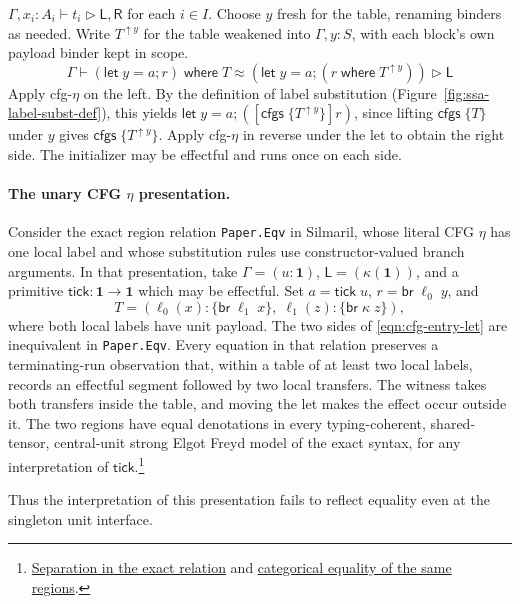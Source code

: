 \documentclass[acmsmall,screen,review]{acmart}
\newcommand{\mb}[1]{\ensuremath{\mathbf{#1}}}
\newcommand{\ms}[1]{\ensuremath{\mathsf{#1}}}
\newcommand{\lto}{:}
\newcommand{\letstmt}[3]{\ensuremath{\ms{let}\;#1 = #2; #3}}
\newcommand{\brb}[2]{\ms{br}\;#1\;#2}
\newcommand{\where}[2]{#1\;\ms{where}\;#2}
\newcommand{\wbranch}[3]{#1(#2) \lto \{#3\}}
\newcommand{\cfgsubst}[1]{\ms{cfgs}\;\{#1\}}
\newcommand{\bhyp}[2]{#1 : #2}
\newcommand{\lhyp}[2]{#1(#2)}
\newcommand{\haslb}[3]{#1 \vdash #2 \rhd #3}
\newcommand{\teqv}{\approx}
\newcommand{\lbeq}[4]{#1 \vdash #2 \teqv #3 \rhd {#4}}
\newcommand{\brle}[1]{{\textsf{#1}}}
\begin{document}
$\haslb{\Gamma,\bhyp{x_i}{A_i}}{t_i}{\ms{L},\ms{R}}$ for each $i\in I$.
Choose $y$ fresh for the table, renaming binders as needed. Write $T^{\uparrow y}$
for the table weakened into $\Gamma,y:S$, with each block's own payload binder kept
in scope.
\begin{equation}
  \lbeq{\Gamma}
    {\where{(\letstmt{y}{a}{r})}{T}}
    {(\letstmt{y}{a}{(\where{r}{T^{\uparrow y}})})}
    {\ms{L}}
  \label{eqn:cfg-entry-let}
\end{equation}
Apply \brle{cfg-$\eta$} on the left. By the definition of label substitution
(Figure~\ref{fig:ssa-label-subst-def}), this yields
$\letstmt{y}{a}{([\cfgsubst{T^{\uparrow y}}]r)}$,
since lifting $\cfgsubst{T}$ under $y$ gives $\cfgsubst{T^{\uparrow y}}$.
Apply \brle{cfg-$\eta$} in reverse under the let to obtain the right side.
The initializer may be effectful and runs once on each side.

\paragraph{The unary CFG $\eta$ presentation.}
Consider the exact region relation \texttt{Paper.Eqv} in Silmaril, whose
literal CFG $\eta$ has one local label and whose substitution rules use
constructor-valued branch arguments. In that presentation, take
$\Gamma=(u:\mb{1})$, $\ms{L}=(\lhyp{\kappa}{\mb{1}})$, and a
primitive $\ms{tick}:\mb{1}\to\mb{1}$ which may be effectful. Set
$a=\ms{tick}\;u$, $r=\brb{\ell_0}{y}$, and
\begin{equation*}
  T=(\wbranch{\ell_0}{x}{\brb{\ell_1}{x}},\;
     \wbranch{\ell_1}{z}{\brb{\kappa}{z}}),
\end{equation*}
where both local labels have unit payload. The two sides of
\eqref{eqn:cfg-entry-let} are inequivalent in \texttt{Paper.Eqv}.
Every equation in that relation preserves a terminating-run observation
that, within a table of at least two local labels, records an effectful
segment followed by two local transfers. The witness takes both transfers
inside the table, and moving the let makes the effect occur outside it.
The two regions have equal denotations in every typing-coherent, shared-tensor,
central-unit strong Elgot Freyd model of the exact syntax, for any
interpretation of $\ms{tick}$.\footnote{
  \href{https://github.com/hiloopai/silmaril-lean/pull/4035}{Separation in the exact relation}
  and \href{https://github.com/hiloopai/silmaril-lean/pull/4049}{categorical equality of the same regions}.
}

Thus the interpretation of this presentation fails to reflect equality even
at the singleton unit interface.
\end{document}
